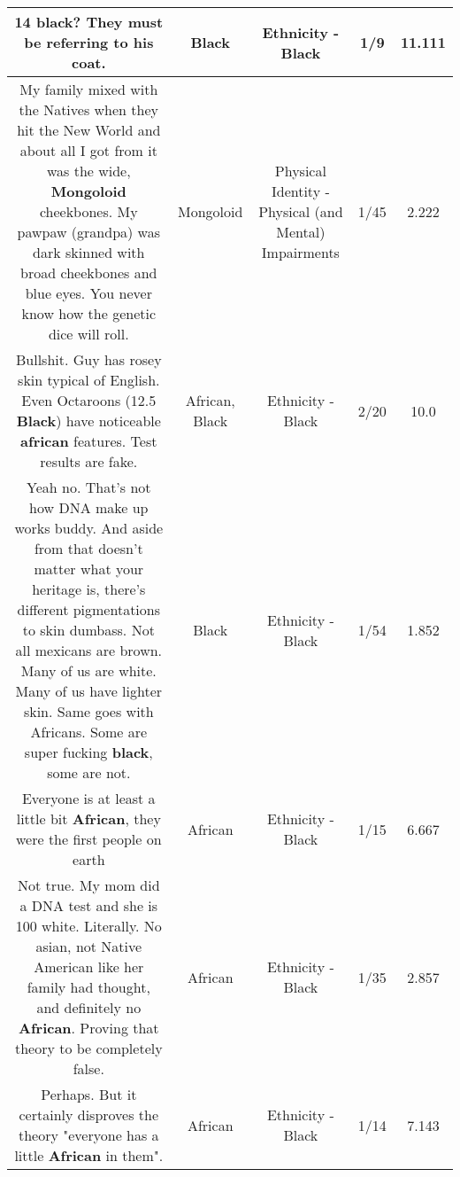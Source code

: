 \documentclass[11pt]{article}
\newlength\mylength
\begin{document}
\begin{center}
\begin{longtable}{|C{.65\mylength}|C{.30\mylength}|C{.12\mylength}|C{.12\mylength}|C{.12\mylength}|}
  \small 14 \textbf{black}? They must be referring to his coat.\normalsize   & Black & Ethnicity - Black & 1/9 & 11.111 \\  \hline
  \small My family mixed with the Natives when they hit the New World and about all I got from it was the wide, \textbf{Mongoloid} cheekbones. My pawpaw (grandpa) was dark skinned with broad cheekbones and blue eyes. You never know how the genetic dice will roll.\normalsize   & Mongoloid & Physical Identity - Physical (and Mental) Impairments & 1/45 & 2.222 \\  \hline
  \small Bullshit. Guy has rosey skin typical of English. Even Octaroons (12.5 \textbf{Black}) have noticeable \textbf{african} features. Test results are fake.\normalsize   & African, Black & Ethnicity - Black & 2/20 & 10.0 \\  \hline
  \small Yeah no. That's not how DNA make up works buddy. And aside from that doesn't matter what your heritage is, there's different pigmentations to skin dumbass. Not all mexicans are brown. Many of us are white. Many of us have lighter skin. Same goes with Africans. Some are super fucking \textbf{black}, some are not.\normalsize   & Black & Ethnicity - Black & 1/54 & 1.852 \\  \hline
  \small Everyone is at least a little bit \textbf{African}, they were the first people on earth\normalsize   & African & Ethnicity - Black & 1/15 & 6.667 \\  \hline
  \small Not true. My mom did a DNA test and she is 100 white. Literally. No asian, not Native American like her family had thought, and definitely no \textbf{African}. Proving that theory to be completely false.\normalsize   & African & Ethnicity - Black & 1/35 & 2.857 \\  \hline
  \small Perhaps. But it certainly disproves the theory "everyone has a little \textbf{African} in them".\normalsize   & African & Ethnicity - Black & 1/14 & 7.143 \\  \hline

\end{longtable}
\end{center}
\end{document}

